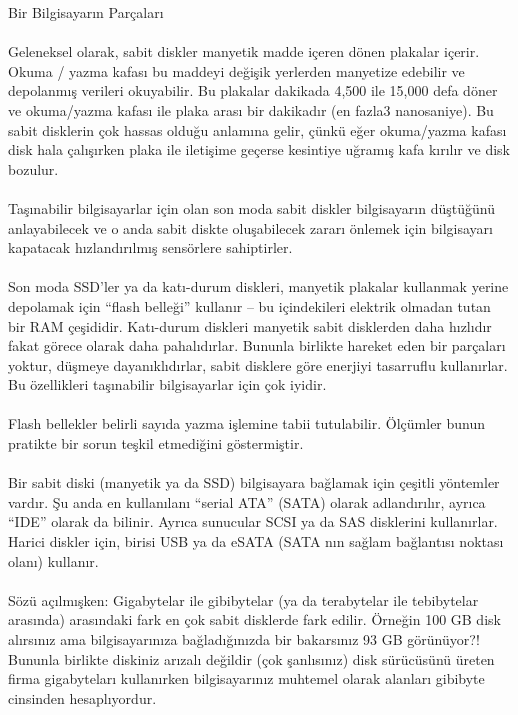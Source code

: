 \documentclass[10pt,a5paper]{book}
\begin{document}
\begin{section}{Bir Bilgisayarın Parçaları}
\paragraph{}{Geleneksel olarak, sabit diskler manyetik madde içeren dönen plakalar içerir. Okuma / yazma kafası bu maddeyi değişik yerlerden manyetize edebilir ve depolanmış verileri okuyabilir. Bu plakalar dakikada 4,500 ile 15,000 defa döner ve okuma/yazma kafası ile plaka arası bir dakikadır (en fazla3 nanosaniye). Bu sabit disklerin çok hassas olduğu anlamına gelir, çünkü eğer okuma/yazma kafası disk hala çalışırken plaka ile iletişime geçerse kesintiye uğramış kafa kırılır ve disk bozulur.}
\paragraph{}{Taşınabilir bilgisayarlar için olan son moda sabit diskler bilgisayarın düştüğünü anlayabilecek ve o anda sabit diskte oluşabilecek zararı önlemek için bilgisayarı kapatacak hızlandırılmış sensörlere sahiptirler.}
\paragraph{}{Son moda SSD'ler ya da katı-durum diskleri, manyetik plakalar kullanmak yerine depolamak için “flash belleği” kullanır – bu içindekileri elektrik olmadan tutan bir RAM çeşididir. Katı-durum diskleri manyetik sabit disklerden daha hızlıdır fakat görece olarak daha pahalıdırlar. Bununla birlikte hareket eden bir parçaları yoktur, düşmeye dayanıklıdırlar, sabit disklere göre enerjiyi tasarruflu kullanırlar. Bu özellikleri taşınabilir bilgisayarlar için çok iyidir.}
\paragraph{}{Flash bellekler belirli sayıda yazma işlemine tabii tutulabilir. Ölçümler bunun pratikte bir sorun teşkil etmediğini göstermiştir.}
\paragraph{}{Bir sabit diski (manyetik ya da SSD) bilgisayara bağlamak için çeşitli yöntemler vardır. Şu anda en kullanılanı “serial ATA” (SATA) olarak adlandırılır, ayrıca “IDE” olarak da bilinir. Ayrıca sunucular SCSI ya da SAS disklerini kullanırlar. Harici diskler için, birisi USB ya da eSATA (SATA nın sağlam bağlantısı noktası olanı) kullanır.}
\paragraph{}{Sözü açılmışken: Gigabytelar ile gibibytelar (ya da terabytelar ile tebibytelar arasında) arasındaki fark en çok sabit disklerde fark edilir. Örneğin 100 GB disk alırsınız ama bilgisayarınıza bağladığınızda bir bakarsınız 93 GB görünüyor?! Bununla birlikte diskiniz arızalı değildir (çok şanlısınız) disk sürücüsünü üreten firma gigabyteları kullanırken bilgisayarınız muhtemel olarak alanları gibibyte cinsinden hesaplıyordur.}

\end{section}
\end{document}
